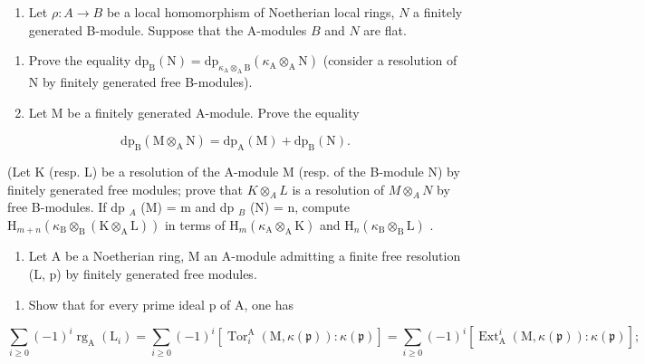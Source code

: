 
\begin{enumerate}
\def\labelenumi{\arabic{enumi})}
\tightlist
\item
  Let \(\rho: A \to B\) be a local homomorphism of Noetherian local rings, \(N\) a finitely generated B-module. Suppose that the A-modules \(B\) and \(N\) are flat.
\end{enumerate}

\begin{enumerate}
\def\labelenumi{\alph{enumi})}
\item
  Prove the equality \(\mathrm{dp}_{\mathrm{B}}(\mathrm{N}) = \mathrm{dp}_{\kappa_{\mathrm{A}} \otimes_{\mathrm{A}} \mathrm{B}}(\kappa_{\mathrm{A}} \otimes_{\mathrm{A}} \mathrm{N})\) (consider a resolution of N by finitely generated free B-modules).
\item
  Let M be a finitely generated A-module. Prove the equality
\end{enumerate}

\[
\mathrm{dp} _ {\mathrm{B}} (\mathrm{M} \otimes_ {\mathrm{A}} \mathrm{N}) = \mathrm{dp} _ {\mathrm{A}} (\mathrm{M}) + \mathrm{dp} _ {\mathrm{B}} (\mathrm{N}).
\]

(Let K (resp. L) be a resolution of the A-module M (resp. of the B-module N) by finitely generated free modules; prove that \(K \otimes_{A} L\) is a resolution of \(M \otimes_{A} N\) by free B-modules. If dp \(_{A}\) (M) = m and dp \(_{B}\) (N) = n, compute \(\mathrm{H}_{m+n}(\kappa_{\mathrm{B}} \otimes_{\mathrm{B}} (\mathrm{K} \otimes_{\mathrm{A}} \mathrm{L}))\) in terms of \(\mathrm{H}_{m}(\kappa_{\mathrm{A}} \otimes_{\mathrm{A}} \mathrm{K})\) and \(\mathrm{H}_{n}(\kappa_{\mathrm{B}} \otimes_{\mathrm{B}} \mathrm{L})\) .

\begin{enumerate}
\def\labelenumi{\arabic{enumi})}
\setcounter{enumi}{1}
\tightlist
\item
  Let A be a Noetherian ring, M an A-module admitting a finite free resolution (L, p) by finitely generated free modules.
\end{enumerate}

\begin{enumerate}
\def\labelenumi{\alph{enumi})}
\tightlist
\item
  Show that for every prime ideal p of A, one has
\end{enumerate}

\[
\sum_ {i \geqslant 0} (- 1) ^ {i} \operatorname{rg} _ {\mathrm{A}} (\mathrm{L} _ {i}) = \sum_ {i \geqslant 0} (- 1) ^ {i} \left[ \operatorname{Tor} _ {i} ^ {\mathrm{A}} (\mathrm{M}, \kappa (\mathfrak {p})): \kappa (\mathfrak {p}) \right] = \sum_ {i \geqslant 0} (- 1) ^ {i} \left[ \operatorname{Ext} _ {\mathrm{A}} ^ {i} (\mathrm{M}, \kappa (\mathfrak {p})): \kappa (\mathfrak {p}) \right];
\]

